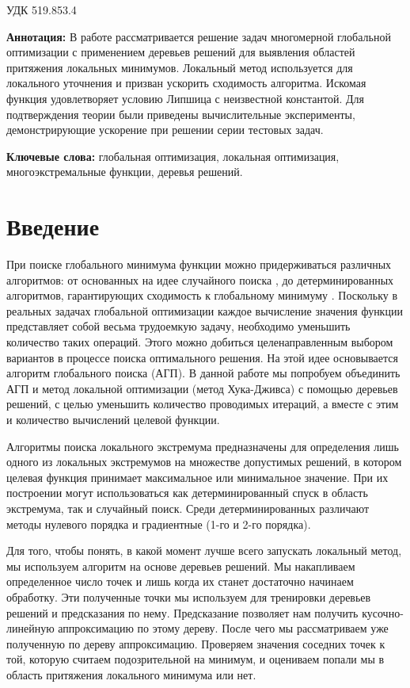 \documentclass[12pt, a4paper, russian]{article}
\begin{document}
УДК 519.853.4

\vspace{\baselineskip}

\begin{small}
\textbf{Аннотация:} В работе рассматривается решение задач многомерной глобальной оптимизации с применением деревьев решений для выявления областей притяжения локальных минимумов. Локальный метод используется для локального уточнения и призван ускорить сходимость алгоритма. Искомая функция удовлетворяет условию Липшица с неизвестной константой. Для подтверждения теории были приведены вычислительные эксперименты, демонстрирующие ускорение при решении серии тестовых задач.

\textbf{Ключевые слова:} глобальная оптимизация, локальная оптимизация, многоэкстремальные функции, деревья решений.
\end{small}


\section{Введение}

При поиске глобального минимума функции можно придерживаться различных алгоритмов: от основанных на идее случайного поиска \cite{fio_bib1, fio_bib2, fio_bib3}, до детерминированных алгоритмов, гарантирующих сходимость к глобальному минимуму \cite{fio_bib4, fio_bib5, fio_bib6}. Поскольку в реальных задачах глобальной оптимизации каждое вычисление значения функции представляет собой весьма трудоемкую задачу, необходимо уменьшить количество таких операций. Этого можно добиться целенаправленным выбором вариантов в процессе поиска оптимального решения. На этой идее основывается алгоритм глобального поиска (АГП). В данной работе мы попробуем объединить АГП и метод локальной оптимизации (метод Хука-Дживса) с помощью деревьев решений, с целью уменьшить количество проводимых итераций, а вместе с этим и количество вычислений целевой функции.

Алгоритмы поиска локального экстремума предназначены для определения лишь одного из локальных экстремумов на множестве допустимых решений, в котором целевая функция принимает максимальное или минимальное значение. При их построении могут использоваться как детерминированный спуск в область экстремума, так и случайный поиск. Среди детерминированных различают методы нулевого порядка и градиентные (1-го и 2-го порядка).

Для того, чтобы понять, в какой момент лучше всего запускать локальный метод, мы используем алгоритм на основе деревьев решений. Мы накапливаем определенное число точек и лишь когда их станет достаточно начинаем обработку. Эти полученные точки мы используем для тренировки деревьев решений и предсказания по нему. Предсказание позволяет нам получить кусочно-линейную аппроксимацию по этому дереву. После чего мы рассматриваем уже полученную по дереву аппроксимацию. Проверяем значения соседних точек к той, которую считаем подозрительной на минимум, и оцениваем попали мы в область притяжения локального минимума или нет. 
\end{document}
